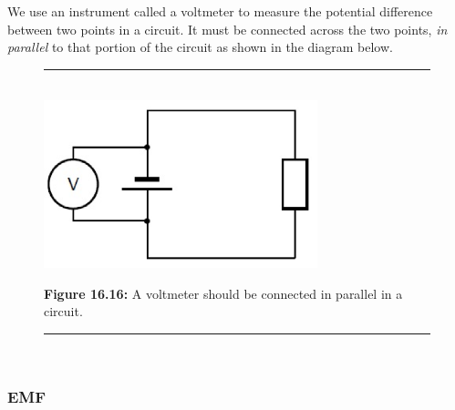 	
	\label{m38772*sp1}
	  We use an instrument called a voltmeter to measure the potential difference between two points in a circuit. It must be connected across the two points, \textsl{in parallel} to that portion of the circuit as shown in the diagram below.
	\par   
        
    \setcounter{subfigure}{0}


	\begin{figure}[H] %
    \begin{center}
    \rule[.1in]{\figurerulewidth}{.005in} \\
        \label{m38772*uid73s1!!!underscore!!!media}\label{m38772*uid73s1!!!underscore!!!printimage}\includegraphics[width=300px]{col11305.imgs/m38772_PG10C9_034.png} %
        
      \vspace{2pt}
    \vspace{\rubberspace}\par \begin{cnxcaption}
	  \small \textbf{Figure 16.16: }A voltmeter should be connected in parallel in a circuit.
	\end{cnxcaption}
      
    \vspace{.1in}
    \rule[.1in]{\figurerulewidth}{.005in} \\
        
    \end{center}

 \end{figure}   

    \addtocounter{footnote}{-0}
    
      \label{m38772*uid45}
            \subsubsection{ EMF}
            \nopagebreak
            
